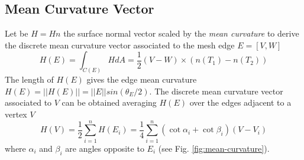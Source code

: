 \subsection{Mean Curvature Vector}
Let be $H = H n$ the surface normal vector scaled by the \textit{mean curvature} to derive the discrete mean curvature vector associated to the mesh edge $E=[V, W]$
$$ H(E) = \int_{C(E)} HdA = \frac{1}{2} (V-W) \times (n(T_1) - n(T_2))$$
The length of $H(E)$ gives the edge mean curvature $H(E) = ||H(E) || = ||E|| sin(\theta_E/2)$. The discrete mean curvature vector associated to $V$ can be obtained averaging $H(E)$ over the edges adjacent to a vertex $V$
$$H(V) = \frac{1}{2} \sum_{i=1}^{n} H(E_i) = \frac{1}{4}\sum_{i=1}^n (\cot \alpha_i + \cot \beta_i)(V - V_i)$$
where $\alpha_i$ and $\beta_i$ are angles opposite to $E_i$ (see Fig. \ref{fig:mean-curvature}).
\cite{geometryprocessing}
